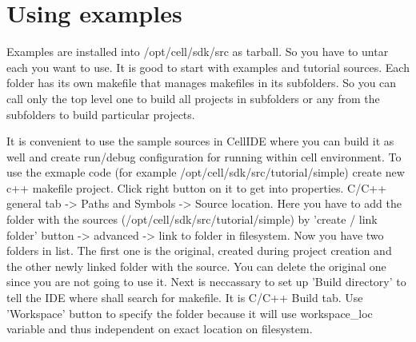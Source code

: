 \section{Using examples}

Examples are installed into /opt/cell/sdk/src as tarball. So you have to untar each you want to use. It is good to start with examples and tutorial sources. Each folder has its own makefile that manages makefiles in its subfolders. So you can call only the top level one to build all projects in subfolders or any from the subfolders to build particular projects.

It is convenient to use the sample sources in CellIDE where you can build it as well and create run/debug configuration for running within cell environment. To use the exmaple code (for example /opt/cell/sdk/src/tutorial/simple) create new c++ makefile project. Click right button on it to get into properties. C/C++ general tab -> Paths and Symbols -> Source location. Here you have to add the folder with the sources (/opt/cell/sdk/src/tutorial/simple) by 'create / link folder' button -> advanced -> link to folder in filesystem. Now you have two folders in list. The first one is the original, created during project creation and the other newly linked folder with the source. You can delete the original one since you are not going to use it.
Next is neccassary to set up 'Build directory' to tell the IDE where shall search for makefile. It is C/C++ Build tab. Use 'Workspace' button to specify the folder because it will use workspace_loc variable and thus independent on exact location on filesystem.  
